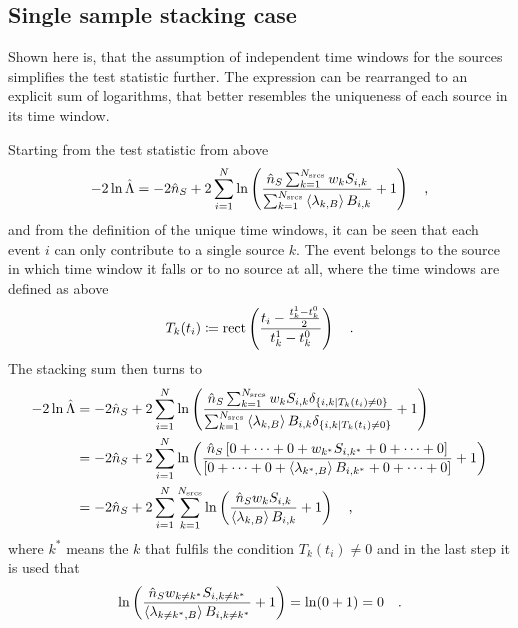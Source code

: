 \subsection{Single sample stacking case}
Shown here is, that the assumption of independent time windows for the sources simplifies the test statistic further.
The expression can be rearranged to an explicit sum of logarithms, that better resembles the uniqueness of each source in its time window.

Starting from the test statistic from above
\begin{equation}
  -2\ln\hat{\Lambda}
  = -2\hat{n}_S +
      2\sum_{i=1}^N \ln\left(
        \frac{\hat{n}_S \sum_{k=1}^{N_\text{srcs}} w_k S_{i,k}}
             {\sum_{k=1}^{N_\text{srcs}}\Braket{\lambda_{k,B}} B_{i,k}}
        + 1
      \right)
  \quad\text{,}
\end{equation}
and from the definition of the unique time windows, it can be seen that each event $i$ can only contribute to a single source $k$.
The event belongs to the source in which time window it falls or to no source at all, where the time windows are defined as above
\begin{equation}
  T_k(t_i) \coloneqq \operatorname{rect} \left(
    \frac{t_i - \frac{t_k^1-t_k^0}{2}} {t_k^1-t_k^0}
  \right)
  \quad\text{.}
\end{equation}
The stacking sum then turns to
\begin{align}
  -2\ln\hat{\Lambda}
  &= -2\hat{n}_S +
      2\sum_{i=1}^N \ln\left(
        \frac{\hat{n}_S \sum_{k=1}^{N_\text{srcs}} w_k S_{i,k}
              \delta_{\{i,k|T_k(t_i)\neq 0\}}}
             {\sum_{k=1}^{N_\text{srcs}}\Braket{\lambda_{k,B}} B_{i,k}
              \delta_{\{i,k|T_k(t_i)\neq 0\}}}
        + 1
      \right) \\
  &= -2\hat{n}_S +
      2\sum_{i=1}^N \ln\left(
        \frac{\hat{n}_S \left[0+\dots+0+ w_{k^*} S_{i,k^*} +0+\dots+0\right]}
             {\left[
              0+\dots+0+ \Braket{\lambda_{k^*,B}} B_{i,k^*} +0+\dots+0
              \right]}
        + 1
      \right) \\
  &= -2\hat{n}_S +
      2\sum_{i=1}^N \sum_{k=1}^{N_\text{srcs}} \ln\left(
        \frac{\hat{n}_S w_k S_{i,k}}{\Braket{\lambda_{k,B}} B_{i,k}}
        + 1
      \right)
  \quad\text{,}
\end{align}
where $k^*$ means the $k$ that fulfils the condition $T_k(t_i)\neq 0$ and in the last step it is used that
\begin{equation}
  \ln\left(
      \frac{\hat{n}_S w_{k\neq k^*} S_{i,k\neq k^*}}
           {\Braket{\lambda_{k\neq k^*,B}} B_{i,k\neq k^*}}
      + 1
    \right)
    = \ln(0 + 1) = 0
  \quad\text{.}
\end{equation}

